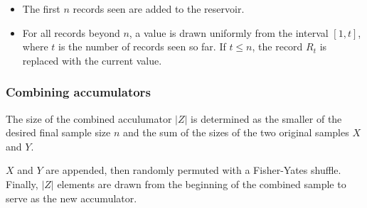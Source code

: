 \documentclass[a4paper]{article}
\begin{document}
\begin{itemize}
\item
The first \(n\) records seen are added to the reservoir.

\item
For all records beyond \(n\), a value is drawn uniformly from the
interval \([1, t]\), where \(t\) is the number of records seen so
far. If \(t \leq n\), the record \(R_t\) is replaced with the current value.
\end{itemize}

\subsubsection{Combining accumulators}

The size of the combined acculumator \(|Z|\) is determined as
the smaller of the desired final sample size \(n\) and the sum of the
sizes of the two original samples \(X\) and \(Y\).

\(X\) and \(Y\) are appended, then randomly permuted with a
Fisher-Yates shuffle\cite[pp.~145-146]{Knuth1997}. Finally, \(|Z|\) elements are drawn from the
beginning of the combined sample to serve as the new accumulator.



\end{document}
